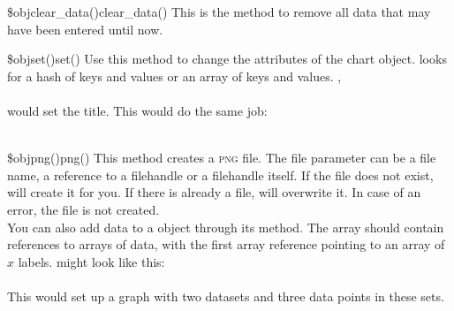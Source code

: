 \begin{MethDecl}{\$obj\deref clear\_data()}{clear\_data()}
This is the method to remove all data that may have been entered until now.
\end{MethDecl}

\begin{MethDecl}{\$obj\deref set()}{set()}
Use this method to change the attributes of the chart object.
 looks for a hash of keys and values or an array of
keys and values. \Eg,\\
\\
would set the title. This would do the same job:\\
\\
\end{MethDecl}

\begin{MethDecl}{\$obj\deref png()}{png()}
This method creates a \textsc{png} file.
The file parameter can be a file name, a reference to a filehandle or a
filehandle itself. If the file does not exist, \chart will
create it for you. If there is already a file, \chart will
overwrite it. In case of an error, the file is not created.\\
You can also add data to a \chart object through its
 method. The  array should contain
references to arrays of data, with the first array reference pointing
to an array of $x$ labels.  might look like this:\\
\\
This would set up a graph with two datasets and three data points in
these sets.
\end{MethDecl}

